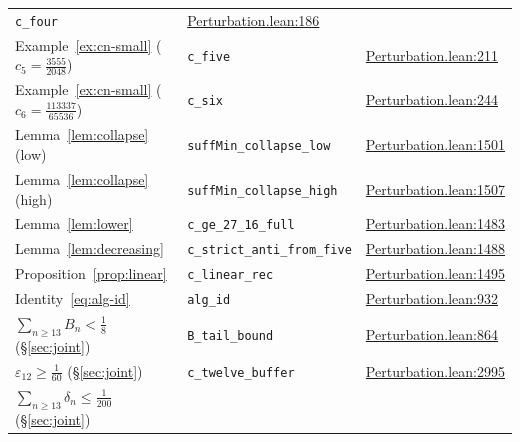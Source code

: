 \documentclass[12pt]{article}
\theoremstyle{definition}
\theoremstyle{remark}
\begin{document}
\begin{table}[h]
\begin{tabular}{@{}lll@{}}
  \texttt{c\_four} &
  \href{https://github.com/pfaffelh/coins/blob/c60bcd3/CoinsLean/CoinsLean/Perturbation.lean\#L186}{Perturbation.lean:186} \\
Example~\ref{ex:cn-small} ($c_5=\tfrac{3555}{2048}$) &
  \texttt{c\_five} &
  \href{https://github.com/pfaffelh/coins/blob/c60bcd3/CoinsLean/CoinsLean/Perturbation.lean\#L211}{Perturbation.lean:211} \\
Example~\ref{ex:cn-small} ($c_6=\tfrac{113337}{65536}$) &
  \texttt{c\_six} &
  \href{https://github.com/pfaffelh/coins/blob/c60bcd3/CoinsLean/CoinsLean/Perturbation.lean\#L244}{Perturbation.lean:244} \\
Lemma~\ref{lem:collapse} (low) &
  \texttt{suffMin\_collapse\_low} &
  \href{https://github.com/pfaffelh/coins/blob/c60bcd3/CoinsLean/CoinsLean/Perturbation.lean\#L1501}{Perturbation.lean:1501} \\
Lemma~\ref{lem:collapse} (high) &
  \texttt{suffMin\_collapse\_high} &
  \href{https://github.com/pfaffelh/coins/blob/c60bcd3/CoinsLean/CoinsLean/Perturbation.lean\#L1507}{Perturbation.lean:1507} \\
Lemma~\ref{lem:lower} &
  \texttt{c\_ge\_27\_16\_full} &
  \href{https://github.com/pfaffelh/coins/blob/c60bcd3/CoinsLean/CoinsLean/Perturbation.lean\#L1483}{Perturbation.lean:1483} \\
Lemma~\ref{lem:decreasing} &
  \texttt{c\_strict\_anti\_from\_five} &
  \href{https://github.com/pfaffelh/coins/blob/c60bcd3/CoinsLean/CoinsLean/Perturbation.lean\#L1488}{Perturbation.lean:1488} \\
Proposition~\ref{prop:linear} &
  \texttt{c\_linear\_rec} &
  \href{https://github.com/pfaffelh/coins/blob/c60bcd3/CoinsLean/CoinsLean/Perturbation.lean\#L1495}{Perturbation.lean:1495} \\
Identity~\eqref{eq:alg-id} &
  \texttt{alg\_id} &
  \href{https://github.com/pfaffelh/coins/blob/c60bcd3/CoinsLean/CoinsLean/Perturbation.lean\#L932}{Perturbation.lean:932} \\
$\sum_{n\ge 13}B_n<\tfrac{1}{8}$ (\S\ref{sec:joint}) &
  \texttt{B\_tail\_bound} &
  \href{https://github.com/pfaffelh/coins/blob/c60bcd3/CoinsLean/CoinsLean/Perturbation.lean\#L864}{Perturbation.lean:864} \\
$\varepsilon_{12}\ge\tfrac{1}{60}$ (\S\ref{sec:joint}) &
  \texttt{c\_twelve\_buffer} &
  \href{https://github.com/pfaffelh/coins/blob/c60bcd3/CoinsLean/CoinsLean/Perturbation.lean\#L2995}{Perturbation.lean:2995} \\
$\sum_{n\ge 13}\delta_n\le\tfrac{1}{200}$ (\S\ref{sec:joint}) &

\end{tabular}
\end{table}
\end{document}
